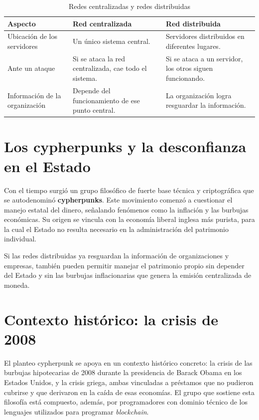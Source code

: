 \documentclass[12pt,oneside]{book}
\begin{document}
\begin{table}[H]
\centering
\caption{Redes centralizadas y redes distribuidas}
\begin{tabular}{p{}p{}p{}}
\toprule
\textbf{Aspecto} & \textbf{Red centralizada} & \textbf{Red distribuida} \\
\midrule
Ubicación de los servidores & Un único sistema central. & Servidores distribuidos en diferentes lugares. \\
Ante un ataque & Si se ataca la red centralizada, cae todo el sistema. & Si se ataca a un servidor, los otros siguen funcionando. \\
Información de la organización & Depende del funcionamiento de ese punto central. & La organización logra resguardar la información. \\
\bottomrule
\end{tabular}
\end{table}

\section{Los cypherpunks y la desconfianza en el Estado}

Con el tiempo surgió un grupo filosófico de fuerte base técnica y criptográfica que se autodenominó \textbf{cypherpunks}. Este movimiento comenzó a cuestionar el manejo estatal del dinero, señalando fenómenos como la inflación y las burbujas económicas. Su origen se vincula con la economía liberal inglesa más purista, para la cual el Estado no resulta necesario en la administración del patrimonio individual.

\begin{important}
Si las redes distribuidas ya resguardan la información de organizaciones y empresas, también pueden permitir manejar el patrimonio propio sin depender del Estado y sin las burbujas inflacionarias que genera la emisión centralizada de moneda.
\end{important}

\section{Contexto histórico: la crisis de 2008}

El planteo cypherpunk se apoya en un contexto histórico concreto: la crisis de las burbujas hipotecarias de 2008 durante la presidencia de Barack Obama en los Estados Unidos, y la crisis griega, ambas vinculadas a préstamos que no pudieron cubrirse y que derivaron en la caída de esas economías. El grupo que sostiene esta filosofía está compuesto, además, por programadores con dominio técnico de los lenguajes utilizados para programar \textit{blockchain}.
\end{document}
